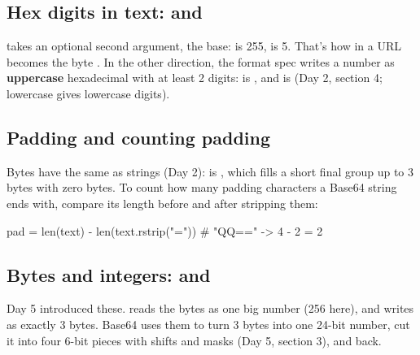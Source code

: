 \documentclass[10pt,a4paper]{article}
\begin{document}
\subsection{Hex digits in text:  and }
 takes an optional second argument, the base:  is 255,  is 5. That’s how  in a URL becomes the byte . In the other direction, the format spec  writes a number as \textbf{uppercase} hexadecimal with at least 2 digits:  is , and  is \code{\textquotedbl{}05\textquotedbl{}} (Day 2, section 4; lowercase  gives lowercase digits).
\subsection{Padding and counting padding}
Bytes have the same  as strings (Day 2):  is , which fills a short final group up to 3 bytes with zero bytes.
To count how many \code{=\allowbreak{}} padding characters a Base64 string ends with, compare its length before and after stripping them:
\begin{pycode}
pad = len(text) - len(text.rstrip("="))     # "QQ==" -> 4 - 2 = 2
\end{pycode}
\subsection{Bytes and integers:  and }
Day 5 introduced these.  reads the bytes as one big number (256 here), and  writes  as exactly 3 bytes. Base64 uses them to turn 3 bytes into one 24-bit number, cut it into four 6-bit pieces with shifts and masks (Day 5, section 3), and back.
\end{document}
